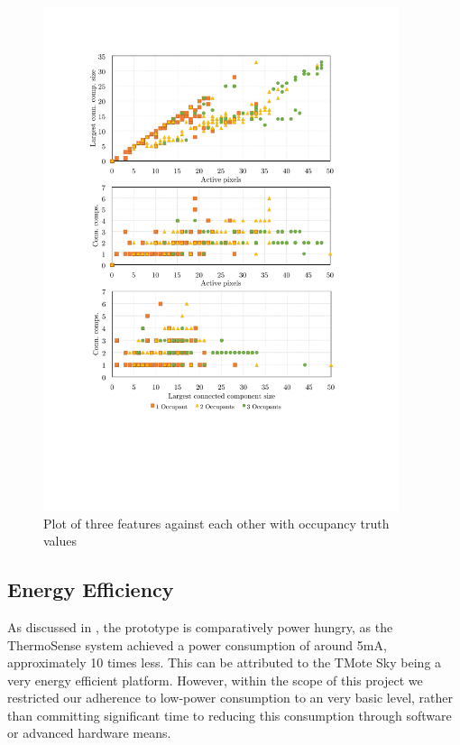 \documentclass[../thesis/thesis.tex]{subfiles}
\begin{document}
\begin{figure}
\centering
\includegraphics[width=0.93\textwidth]{../diagrams/feature-plots.pdf}
\caption{Plot of three features against each other with occupancy truth values}
\label{fig:featplots}
\end{figure}

\clearpage{}

\subsection{Energy Efficiency}
As discussed in , the prototype is comparatively power hungry, as the ThermoSense system achieved a power consumption of around 5mA, approximately 10 times less. This can be attributed to the TMote Sky being a very energy efficient platform. However, within the scope of this project we restricted our adherence to low-power consumption to an very basic level, rather than committing significant time to reducing this consumption through software or advanced hardware means.
\end{document}
